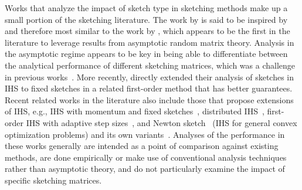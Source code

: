 Works that analyze the impact of sketch type in sketching methods make up a small portion of the sketching literature. The work by \citet{Lacotte:2020} is said to be inspired by and therefore most similar to the work by \citet{Dobriban:2019}, which appears to be the first in the literature to leverage results from asymptotic random matrix theory. Analysis in the asymptotic regime appears to be key in being able to differentiate between the analytical performance of different sketching matrices, which was a challenge in previous works~\citep{Choromanski:2017,Pilanci:2016,Raskutti:2016}. More recently, \citet{Lacotte:2020b} directly extended their analysis of sketches in IHS to fixed sketches in a related first-order method that has better guarantees.
\\

Recent related works in the literature also include those that propose extensions of IHS, e.g., IHS with momentum and fixed sketches~\citep{Ozaslan:2019}, distributed IHS~\citep{Derezinski:2020}, first-order IHS with adaptive step sizes~\citep{Zhang:2020}, and Newton sketch~\citep{Pilanci:2017} (IHS for general convex optimization problems) and its own variants~\citep[e.g.,][]{Derezinski:2021,Lacotte:2021}. Analyses of the performance in these works generally are intended as a point of comparison against existing methods, are done empirically or make use of conventional analysis techniques rather than asymptotic theory, and do not particularly examine the impact of specific sketching matrices.